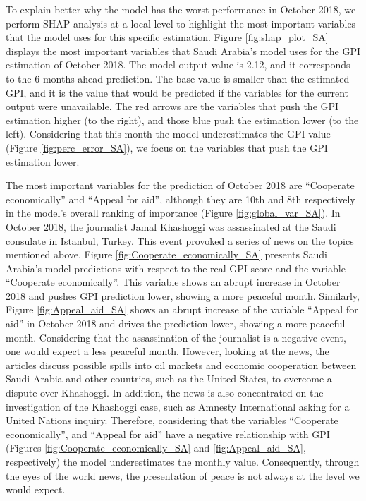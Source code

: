 \documentclass{bmcart}
\begin{document}
To explain better why the model has the worst performance in October 2018, we perform SHAP analysis at a local level to highlight the most important variables that the model uses for this specific estimation. Figure \ref{fig:shap_plot_SA} displays the most important variables that Saudi Arabia's model uses for the GPI estimation of October 2018. The model output value is 2.12, and it corresponds to the 6-months-ahead prediction. The base value is smaller than the estimated GPI, and it is the value that would be predicted if the variables for the current output were unavailable. The red arrows are the variables that push the GPI estimation higher (to the right), and those blue push the estimation lower (to the left). Considering that this month the model underestimates the GPI value (Figure \ref{fig:perc_error_SA}), we focus on the variables that push the GPI estimation lower. 

The most important variables for the prediction of October 2018 are ``Cooperate economically'' and ``Appeal for aid'', although they are 10th and 8th respectively in the model's overall ranking of importance (Figure \ref{fig:global_var_SA}). 
In October 2018, the journalist Jamal Khashoggi was assassinated at the Saudi consulate in Istanbul, Turkey. This event provoked a series of news on the topics mentioned above. 
Figure \ref{fig:Cooperate_economically_SA} presents Saudi Arabia's model predictions with respect to the real GPI score and the variable ``Cooperate economically''. 
This variable shows an abrupt increase in October 2018 and pushes GPI prediction lower, showing a more peaceful month. 
Similarly, Figure \ref{fig:Appeal_aid_SA} shows an abrupt increase of the variable ``Appeal for aid'' in October 2018 and drives the prediction lower, showing a more peaceful month. 
Considering that the assassination of the journalist is a negative event, one would expect a less peaceful month. 
However, looking at the news, the articles discuss possible spills into oil markets and economic cooperation between Saudi Arabia and other countries, such as the United States, to overcome a dispute over Khashoggi. 
In addition, the news is also concentrated on the investigation of the Khashoggi case, such as Amnesty International asking for a United Nations inquiry. 
Therefore, considering that the variables ``Cooperate economically'', and ``Appeal for aid'' have a negative relationship with GPI (Figures \ref{fig:Cooperate_economically_SA} and \ref{fig:Appeal_aid_SA}, respectively) the model underestimates the monthly value.
Consequently, through the eyes of the world news, the presentation of peace is not always at the level we would expect.
\end{document}
